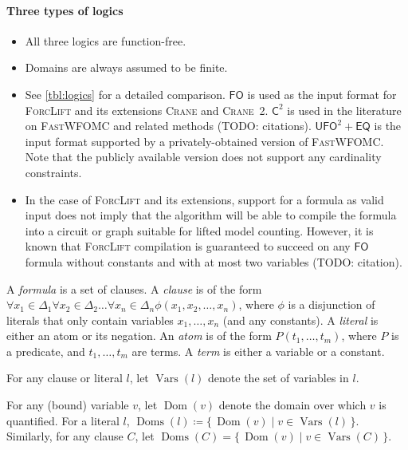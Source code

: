 \documentclass{article}
\theoremstyle{definition}
\DeclareMathOperator{\Dom}{Dom}
\DeclareMathOperator{\Doms}{Doms}
\DeclareMathOperator{\Vars}{Vars}
\newcommand{\Ctwo}{$\mathsf{C}^{2}$}
\newcommand{\FO}{$\mathsf{FO}$}
\newcommand{\UFO}{$\mathsf{UFO}^{2} + \mathsf{EQ}$}
\newcommand{\Cranetwo}{\textsc{Crane}~2}
\begin{document}
\paragraph{Three types of logics}
\begin{itemize}
  \item All three logics are function-free.
  \item Domains are always assumed to be finite.
  \item See \cref{tbl:logics} for a detailed comparison. \FO{} is used as the
        input format for \textsc{ForcLift} and its extensions \textsc{Crane} and
        \Cranetwo{}. \Ctwo{} is used in the literature on \textsc{FastWFOMC} and
        related methods (TODO: citations). \UFO{} is the input format supported
        by a privately-obtained version of \textsc{FastWFOMC}. Note that the
        publicly available version does not support any cardinality constraints.
  \item In the case of \textsc{ForcLift} and its extensions, support for a
        formula as valid input does not imply that the algorithm will be able to
        compile the formula into a circuit or graph suitable for lifted model
        counting. However, it is known that \textsc{ForcLift} compilation is
        guaranteed to succeed on any \FO{} formula without constants and with at
        most two variables (TODO: citation).
\end{itemize}

A \emph{formula} is a set of clauses. A \emph{clause} is of the form
$\forall x_{1} \in \Delta_{1}\forall x_{2} \in \Delta_{2}\dots\forall x_{n} \in \Delta_{n} \phi(x_{1}, x_{2}, \dots, x_{n})$,
where $\phi$ is a disjunction of literals that only contain variables
$x_{1}, \dots, x_{n}$ (and any constants). A \emph{literal} is either an atom or
its negation. An \emph{atom} is of the form $P(t_{1}, \dots, t_{m})$, where $P$
is a predicate, and $t_{1}, \dots, t_{m}$ are terms. A \emph{term} is either a
variable or a constant.


For any clause or literal $l$, let $\Vars(l)$ denote the set of variables in
$l$.

For any (bound) variable $v$, let $\Dom(v)$ denote the domain over which $v$ is
quantified. For a literal $l$,
$\Doms(l) \coloneqq \{\, \Dom(v) \mid v \in \Vars(l) \,\}$. Similarly, for any
clause $C$, let $\Doms(C) = \{\, \Dom(v) \mid v \in \Vars(C) \,\}$.
\end{document}
